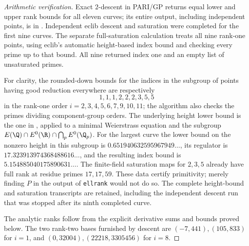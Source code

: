 \begin{proof}[Arithmetic verification]
Exact $2$-descent in PARI/GP returns equal lower and upper rank bounds
for all eleven curves; its entire output, including independent points,
is in . Independent eclib descent
and saturation were completed for the first nine curves. The separate
full-saturation calculation  treats
all nine rank-one points, using eclib's automatic height-based index
bound and checking every prime up to that bound. All nine returned
index one and an empty list of unsaturated primes.

For clarity, the rounded-down bounds for the indices in the subgroup
of points having good reduction everywhere are respectively
\[
 1,1,1,2,2,2,3,5,5
\]
in the rank-one order $i=2,3,4,5,6,7,9,10,11$; the algorithm also
checks the primes dividing component-group orders. The underlying
height lower bound is the one in
\citet[Theorem 1]{CrCremonaSiksek2006}, applied to a minimal
Weierstrass equation and the subgroup
$E(\Q)\cap E^0(\R)\cap\bigcap_pE^0(\Q_p)$.
For the largest curve the lower bound on the nonzero height in this
subgroup is $0.651940632595967949\ldots$, its regulator is
$17.323913974368488616\ldots$, and the resulting index bound is
$5.154885040175890631\ldots$. The finite-field saturation maps for
$2,3,5$ already have full rank at residue primes $17,17,59$.
These data certify primitivity; merely finding $P$ in the output of
\texttt{ellrank} would not do so. The complete height-bound and
saturation transcripts are retained, including the independent
descent run that was stopped after its ninth completed curve.

The analytic ranks follow from the explicit derivative sums and bounds
proved below. The two rank-two bases furnished by descent are
$(-7,441),(105,833)$ for $i=1$, and
$(0,32004),(22218,3305456)$ for $i=8$.
\end{proof}

